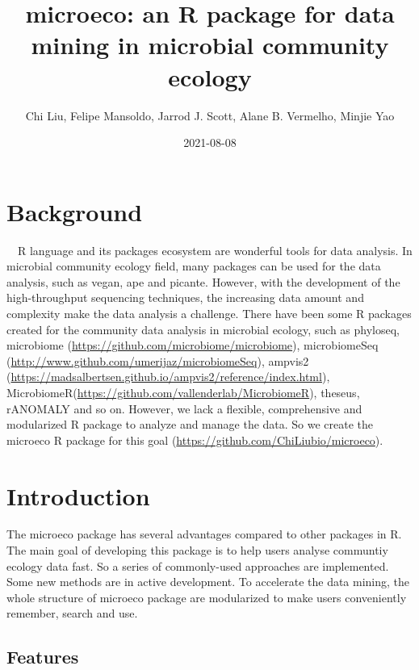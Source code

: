 \documentclass[
]{book}
\title{microeco: an R package for data mining in microbial community ecology}
\author{Chi Liu, Felipe Mansoldo, Jarrod J. Scott, Alane B. Vermelho, Minjie Yao}
\date{2021-08-08}
\begin{document}
\maketitle

{
\setcounter{tocdepth}{1}
\tableofcontents
}
\hypertarget{background}{%
\chapter{Background}\label{background}}

　R language \citep{R-base} and its packages ecosystem are wonderful tools for data analysis.
In microbial community ecology field, many packages can be used for the data analysis,
such as vegan\citep{Jari_vegan_2019}, ape\citep{Paradis_ape_2018} and picante\citep{Picante_Kembel_2010}.
However, with the development of the high-throughput sequencing techniques,
the increasing data amount and complexity make the data analysis a challenge.
There have been some R packages created for the community data analysis in microbial ecology, such as phyloseq\citep{Mcmurdie_phyloseq_2013},
microbiome (\url{https://github.com/microbiome/microbiome}), microbiomeSeq (\url{http://www.github.com/umerijaz/microbiomeSeq}),
ampvis2 (\url{https://madsalbertsen.github.io/ampvis2/reference/index.html}), MicrobiomeR(\url{https://github.com/vallenderlab/MicrobiomeR}),
theseus\citep{Price_theseus_2018}, rANOMALY\citep{Theil_rANOMALY_2021} and so on.
However, we lack a flexible, comprehensive and modularized R package to analyze and manage the data.
So we create the microeco R package\citep{Liu_microeco_2021} for this goal (\url{https://github.com/ChiLiubio/microeco}).

\hypertarget{intro}{%
\chapter{Introduction}\label{intro}}

The microeco package has several advantages compared to other packages in R.
The main goal of developing this package is to help users analyse communtiy ecology data fast.
So a series of commonly-used approaches are implemented.
Some new methods are in active development.
To accelerate the data mining, the whole structure of microeco package are modularized to
make users conveniently remember, search and use.

\hypertarget{features}{%
\section{Features}\label{features}}
\end{document}
